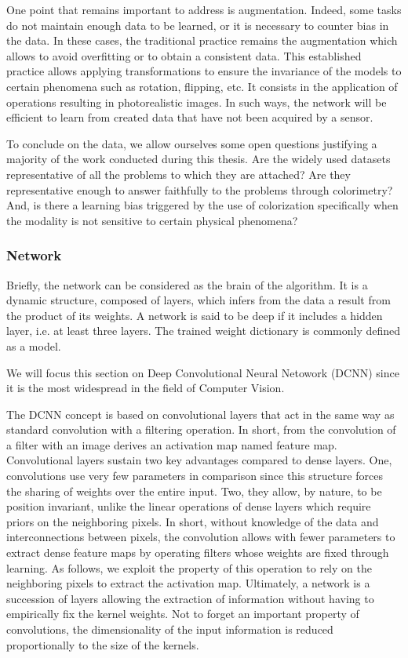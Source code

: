 One point that remains important to address is augmentation. Indeed, some tasks do not maintain enough data to be learned, or it is necessary to counter bias in the data. In these cases, the traditional practice remains the augmentation which allows to avoid overfitting \cite{DBLP:journals/corr/abs-1712-04621} or to obtain a consistent data. This established practice allows applying transformations to ensure the invariance of the models to certain phenomena such as rotation, flipping, etc. It consists in the application of operations resulting in photorealistic images. In such ways, the network will be efficient to learn from created data that have not been acquired by a sensor. 



To conclude on the data, we allow ourselves some open questions justifying a majority of the work conducted during this thesis.
Are the widely used datasets representative of all the problems to which they are attached? Are they representative enough to answer faithfully to the problems through colorimetry?
And, is there a learning bias triggered by the use of colorization specifically when the modality is not sensitive to certain physical phenomena?

\subsubsection{Network}
Briefly, the network can be considered as the brain of the algorithm. It is a dynamic structure, composed of layers, which infers from the data a result from the product of its weights.
A network is said to be deep if it includes a hidden layer, i.e. at least three layers.
The trained weight dictionary is commonly defined as a model.

We will focus this section on Deep Convolutional Neural Netowork (DCNN) since it is the most widespread in the field of Computer Vision.

The DCNN concept is based on convolutional layers that act in the same way as standard convolution with a filtering operation. In short, from the convolution of a filter with an image derives an activation map named feature map. 
Convolutional layers sustain two key advantages compared to dense layers. One, convolutions use very few parameters in comparison since this structure forces the sharing of weights over the entire input. Two, they allow, by nature, to be position invariant, unlike the linear operations of dense layers which require priors on the neighboring pixels.
In short, without knowledge of the data and interconnections between pixels, the convolution allows with fewer parameters to extract dense feature maps by operating filters whose weights are fixed through learning. As follows, we exploit the property of this operation to rely on the neighboring pixels to extract the activation map. Ultimately, a network is a succession of layers allowing the extraction of information without having to empirically fix the kernel weights.
Not to forget an important property of convolutions, the dimensionality of the input information is reduced proportionally to the size of the kernels. 


